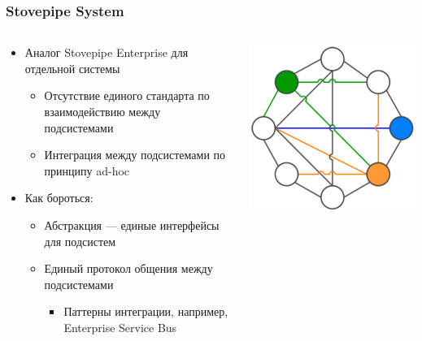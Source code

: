 \documentclass[xetex,mathserif,serif]{beamer}
\begin{document}
\begin{frame}
\begin{columns}
\begin{column}{0.4\textwidth}
\begin{center}
				\end{center}	
			\end{column}
		\end{columns}
	\end{frame}

	\begin{frame}
		\frametitle{Stovepipe System}
		\begin{columns}
			\begin{column}{0.7\textwidth}
				\begin{itemize}
					\item Аналог Stovepipe Enterprise для отдельной системы
					\begin{itemize}
						\item Отсутствие единого стандарта по взаимодействию между подсистемами
						\item Интеграция между подсистемами по принципу ad-hoc
					\end{itemize}
					\item Как бороться:
					\begin{itemize}
						\item Абстракция --- единые интерфейсы для подсистем
						\item Единый протокол общения между подсистемами
						\begin{itemize}
							\item Паттерны интеграции, например, Enterprise Service Bus
						\end{itemize}
					\end{itemize}
				\end{itemize}
			\end{column}
			\begin{column}{0.3\textwidth}
				\begin{center}
					\includegraphics[width=\textwidth]{stovepipeSystem.png}

\end{center}
\end{column}
\end{columns}
\end{frame}
\end{document}
